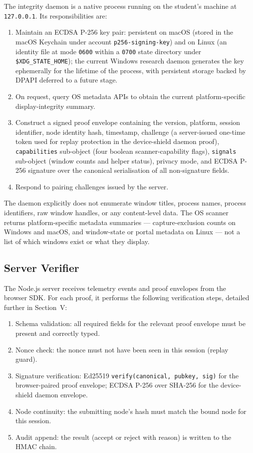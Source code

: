 \documentclass[conference]{IEEEtran}
\begin{document}
The integrity daemon is a native process running on the student's machine at \texttt{127.0.0.1}. Its responsibilities are:
\begin{enumerate}
\item Maintain an ECDSA P-256 key pair: persistent on macOS (stored in the macOS Keychain under account \texttt{p256-signing-key}) and on Linux (an identity file at mode \texttt{0600} within a \texttt{0700} state directory under \texttt{\$XDG\_STATE\_HOME}); the current Windows research daemon generates the key ephemerally for the lifetime of the process, with persistent storage backed by DPAPI deferred to a future stage.
\item On request, query OS metadata APIs to obtain the current platform-specific display-integrity summary.
\item Construct a signed proof envelope containing the version, platform, session identifier, node identity hash, timestamp, challenge (a server-issued one-time token used for replay protection in the device-shield daemon proof), \texttt{capabilities} sub-object (four boolean scanner-capability flags), \texttt{signals} sub-object (window counts and helper status), privacy mode, and ECDSA P-256 signature over the canonical serialisation of all non-signature fields.
\item Respond to pairing challenges issued by the server.
\end{enumerate}

The daemon explicitly does not enumerate window titles, process names, process identifiers, raw window handles, or any content-level data. The OS scanner returns platform-specific metadata summaries — capture-exclusion counts on Windows and macOS, and window-state or portal metadata on Linux — not a list of which windows exist or what they display.

\subsection{Server Verifier}

The Node.js server receives telemetry events and proof envelopes from the browser SDK. For each proof, it performs the following verification steps, detailed further in Section~V:
\begin{enumerate}
\item Schema validation: all required fields for the relevant proof envelope must be present and correctly typed.
\item Nonce check: the nonce must not have been seen in this session (replay guard).
\item Signature verification: Ed25519 \texttt{verify(canonical, pubkey, sig)} for the browser-paired proof envelope; ECDSA P-256 over SHA-256 for the device-shield daemon envelope.
\item Node continuity: the submitting node's hash must match the bound node for this session.
\item Audit append: the result (accept or reject with reason) is written to the HMAC chain.
\end{enumerate}
\end{document}
